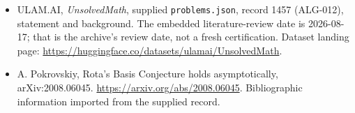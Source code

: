 \documentclass[11pt,a4paper]{article}
\begin{document}
{\small

\begin{itemize}

\item[\hypertarget{source:1457:1}{S1}] ULAM.AI, \emph{UnsolvedMath}, supplied \texttt{problems.json}, record 1457 (ALG-012), statement and background. The embedded literature-review date is 2026-08-17; that is the archive’s review date, not a fresh certification. Dataset landing page: \url{https://huggingface.co/datasets/ulamai/UnsolvedMath}.

\item[\hypertarget{source:1457:2}{S2}] A. Pokrovskiy, Rota's Basis Conjecture holds asymptotically, arXiv:2008.06045. \url{https://arxiv.org/abs/2008.06045}. Bibliographic information imported from the supplied record.

\end{itemize}

}

\label{end:1457}
\end{document}
